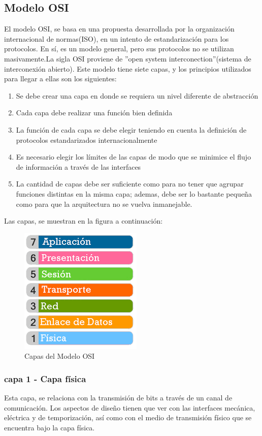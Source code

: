 \subsection{Modelo OSI}
El modelo OSI, se basa en una propuesta desarrollada por la organización internacional de normas(ISO), en un intento de estandarización para los protocolos. En sí, es un modelo general, pero sus protocolos no se utilizan masivamente.La sigla OSI proviene de ''open system interconection''(sistema de interconexión abierto). Este modelo tiene siete capas, y los principios utilizados para llegar a ellas son los siguientes:
\begin{enumerate}
	\item Se debe crear una capa en donde se requiera un nivel diferente de abstracción 
	\item Cada capa debe realizar una función bien definida 
	\item La función de cada capa se debe elegir teniendo en cuenta la definición de protocolos estandarizados
	internacionalmente
	\item Es necesario elegir los límites de las capas de modo que se minimice el flujo de información a través de las interfaces 
	\item La cantidad de capas debe ser suficiente como para no tener que agrupar funciones distintas en
	la misma capa; ademas, debe ser lo bastante pequeña como para que la arquitectura no se vuelva
	inmanejable. 
\end{enumerate} 
Las capas, se muestran en la figura a continuación:%
\vspace{-2mm}  
\begin{figure}[ht]
	\centering
	\includegraphics[scale=0.5]{modelosi} 
	\caption{Capas del Modelo OSI}
	\label{fig:mod_osi}
\end{figure}  


\subsubsection{capa 1 - Capa física} 
Esta capa, se relaciona con la transmisión de bits a través de un canal de comunicación. Los aspectos de diseño tienen que ver con las interfaces mecánica, eléctrica y de temporización, así como con el medio de transmisión físico que se encuentra bajo la capa física.


